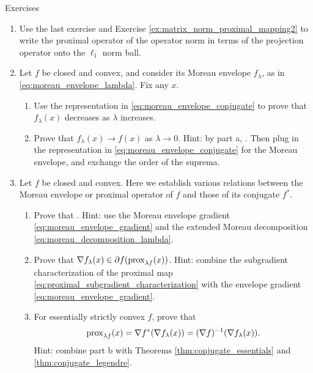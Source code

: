 \begin{xcb}{Exercises}
\begin{enumerate}[label=\thechapter.\arabic*]
\item \label{ex:operator_norm_proximal_mapping} 
  Use the last exercise and Exercise \ref{ex:matrix_norm_proximal_mapping2} to
  write the proximal operator of the operator norm in terms of the projection
  operator onto the $\ell_1$ norm ball.   

\item \label{ex:moreau_envelope_conjugate}
  Let $f$ be closed and convex, and consider its Moreau envelope $f_\lambda$, as
  in \eqref{eq:moreau_envelope_lambda}. Fix any $x$.

\begin{enumerate}[label=\alph*.]
\item Use the representation in \eqref{eq:moreau_envelope_conjugate} to prove
  that $f_\lambda(x)$ decreases as $\lambda$ increases.   

\item Prove that $f_\lambda(x) \to f(x)$ as $\lambda \to 0$. Hint: by part a, 
  . Then plug in the representation in
  \eqref{eq:moreau_envelope_conjugate} for the Moreau envelope, and exchange the 
  order of the suprema.   
\end{enumerate}

\item Let $f$ be closed and convex. Here we establish various relations between
  the Moreau envelope or proximal operator of $f$ and those of its conjugate
  $f^*$. 

\begin{enumerate}[label=\alph*.]
\item Prove that . Hint: use the Moreau envelope gradient
\eqref{eq:moreau_envelope_gradient} and the extended Moreau decomposition
\eqref{eq:moreau_decomposition_lambda}.   

\item Prove that $\nabla f_\lambda(x) \in \partial f (\operatorname{prox}_{\lambda
    f}(x))$. Hint: combine the subgradient characterization of the proximal map
  \eqref{eq:proximal_subgradient_characterization} with the envelope gradient 
  \eqref{eq:moreau_envelope_gradient}.  

\item For essentially strictly convex $f$, prove that 
  \[
  \operatorname{prox}_{\lambda  f}(x) = \nabla f^*(\nabla f_\lambda(x)) = (\nabla f)^{-1}
  (\nabla f_\lambda(x)).
  \]
  Hint: combine part b with Theorems \ref{thm:conjugate_essentials} and
  \ref{thm:conjugate_legendre}. 
\end{enumerate}
\end{enumerate}
\end{xcb}

